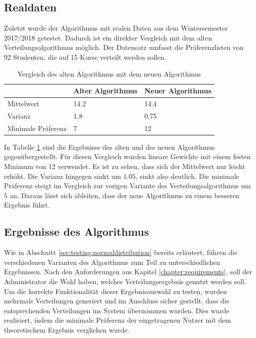 		\subsection{Realdaten}
		
			Zuletzt wurde der Algorithmus mit realen Daten aus dem Wintersemester 2017/2018 getestet.
            Dadurch ist ein direkter Vergleich mit dem alten Verteilungsalgorithmus möglich.
            Der Datensatz umfasst die Präferenzlisten von 92 Studenten, die auf 15 Kurse verteilt werden sollen.
			
			\begin{table}[h]
				\centering
				\begin{tabular}{l|l|l}
					& Alter Algorithmus & Neuer Algorithmus \\
					\hline
					Mittelwert & 14.2 & 14.4 \\
					Varianz & 1,8 & 0,75 \\
					Minimale Präferenz & 7 & 12 \\
				\end{tabular}
				\caption{Vergleich des alten Algorithmus mit dem neuen Algorithmus}
				\label{tab:old_versus_new_algorithm}
			\end{table}
		
            In Tabelle \ref{tab:old_versus_new_algorithm} sind die Ergebnisse des alten und des neuen Algorithmus gegenübergestellt.
            Für diesen Vergleich wurden lineare Gewichte mit einem festen Minimum von 12 verwendet.
            Es ist zu sehen, dass sich der Mittelwert nur leicht erhöht.
            Die Varianz hingegen sinkt um $ 1.05 $, sinkt also deutlich.
            Die minimale Präferenz steigt im Vergleich zur vorigen Variante des Verteilungsalgorithmus um $ 5 $ an.			
			Daraus lässt sich ableiten, dass der neue Algorithmus zu einem besseren Ergebnis führt.
			
		\subsection{Ergebnisse des Algorithmus}
			
			Wie in Abschnitt \ref{sec:testing:normaldistribution} bereits erläutert, führen die verschiedenen Varianten des Algorithmus zum Teil zu unterschiedlichen Ergebnissen.
			Nach den Anforderungen aus Kapitel \ref{chapter:requirements}, soll der Administrator die Wahl haben, welches Verteilungsergebnis genutzt werden soll.
            Um die korrekte Funktionalität dieser Ergebnisauswahl zu testen, wurden mehrmals Verteilungen generiert und im Anschluss sicher gestellt, dass die entsprechenden Verteilungen ins System übernommen wurden.
            Dies wurde realisiert, indem die minimale Präferenz der eingetragenen Nutzer mit dem theoretischem Ergebnis verglichen wurde.\\


